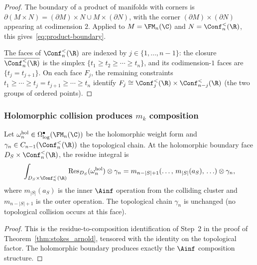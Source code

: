\begin{proof}
The boundary of a product of manifolds with corners is
$\partial(M \times N) = (\partial M) \times N
\cup M \times (\partial N)$, with the corner
$(\partial M) \times (\partial N)$ appearing at
codimension $2$. Applied to
$M = \FM_n(\C)$ and $N = \Conf_n^<(\R)$, this
gives~\eqref{eq:product-boundary}.

The faces of $\Conf_n^<(\R)$ are indexed by
$j \in \{1, \ldots, n-1\}$: the closure
$\overline{\Conf_n^<(\R)}$ is the simplex
$\{t_1 \ge t_2 \ge \cdots \ge t_n\}$, and its
codimension-$1$ faces are $\{t_j = t_{j+1}\}$.
On each face $F_j$, the remaining constraints
$t_1 \ge \cdots \ge t_j = t_{j+1} \ge \cdots \ge t_n$
identify $F_j \cong \Conf_j^<(\R) \times
\Conf_{n-j}^<(\R)$ (the two groups of ordered points).
\end{proof}

\subsubsection{Holomorphic collision produces $m_k$
composition}

\begin{proposition}
Let $\omega_n^{\mathrm{hol}} \in
\Omega^\bullet_{\log}(\FM_n(\C))$ be the holomorphic
weight form and $\gamma_n \in C_{n-1}(\Conf_n^<(\R))$
the topological chain. At the holomorphic boundary face
$D_S \times \Conf_n^<(\R)$, the residue integral is
\begin{equation}%
\int_{D_S \times \Conf_n^<(\R)}
\Res_{D_S}(\omega_n^{\mathrm{hol}}) \otimes \gamma_n
= m_{n-|S|+1}(\ldots,\,
m_{|S|}(a_S),\, \ldots)
\otimes \gamma_n,
\end{equation}
where $m_{|S|}(a_S)$ is the inner $\Ainf$ operation
from the colliding cluster and $m_{n-|S|+1}$ is the
outer operation. The topological chain $\gamma_n$ is
unchanged (no topological collision occurs at this face).
\end{proposition}

\begin{proof}
This is the residue-to-composition identification
of Step~2 in the proof of Theorem~\ref{thm:stokes_arnold},
tensored with the identity on the topological factor.
The holomorphic boundary produces exactly the $\Ainf$
composition structure.
\end{proof}

